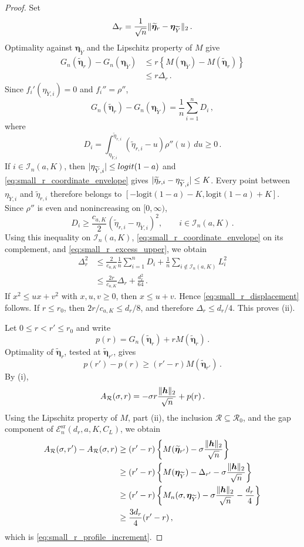 \documentclass[10pt,a4paper]{amsart}
\makeatletter
\def\Ytil{\widetilde{Y}}
\newcommand{\abs}[1]{%
	\ensuremath{%
		\if@display
		\left| #1 \right|
		\else
		\lvert #1 \rvert
		\fi
	}%
}
\def\bEtaYtil{\bb{\eta}_{\Ytil}}
\newcommand*{\bb}{\boldsymbol}
\def\bh{\bb{h}}
\newcommand{\logit}[1]{\ensuremath{\textrm{logit}(#1)}}
\newcommand{\vnorm}[1]{%
	\ensuremath{%
		\if@display
		\left\| #1 \right\|
		\else
		\| #1 \|
		\fi
	}%
}
\makeatother
\begin{document}
\begin{proof}
Set
$$
	\Delta_r
	=
	\frac1{\sqrt n}
	\vnorm{
		\widetilde{\bb\eta}_r-\bEtaYtil
	}_2\,.
$$
Optimality against $\bEtaYtil$ and the Lipschitz property of $M$ give
\begin{equation}
\label{eq:small_r_excess_upper}
\begin{aligned}
	G_n(\widetilde{\bb\eta}_r)
	-
	G_n(\bEtaYtil)
	&\leq
	r
	\left\{
		M(\bEtaYtil)-M(\widetilde{\bb\eta}_r)
	\right\}
	\\
	&\leq
	r\Delta_r\,.
\end{aligned}
\end{equation}
Since $f_i'(\eta_{\Ytil,i})=0$ and $f_i''=\rho''$,
$$
	G_n(\widetilde{\bb\eta}_r)
	-
	G_n(\bEtaYtil)
	=
	\frac1n\sum_{i=1}^nD_i\,,
$$
where
$$
	D_i
	=
	\int_{\eta_{\Ytil,i}}^{\widetilde\eta_{r,i}}
	(\widetilde\eta_{r,i}-u)\rho''(u)\,du
	\geq
	0\,.
$$
If $i\in\mathcal I_n(a,K)$, then
$\abs{\eta_{\Ytil,i}}\leq\logit{1-a}$ and
\eqref{eq:small_r_coordinate_envelope} gives
$\abs{\widetilde\eta_{r,i}-\eta_{\Ytil,i}}\leq K$. Every point between
$\eta_{\Ytil,i}$ and $\widetilde\eta_{r,i}$ therefore belongs to
$[-\logit{1-a}-K,\logit{1-a}+K]$. Since $\rho''$ is even and nonincreasing on
$[0,\infty)$,
$$
	D_i
	\geq
	\frac{c_{a,K}}2
	(\widetilde\eta_{r,i}-\eta_{\Ytil,i})^2,
	\qquad
	i\in\mathcal I_n(a,K)\,.
$$
Using this inequality on $\mathcal I_n(a,K)$,
\eqref{eq:small_r_coordinate_envelope} on its complement, and
\eqref{eq:small_r_excess_upper}, we obtain
$$
\begin{aligned}
	\Delta_r^2
	&\leq
	\frac{2}{c_{a,K}}
	\frac1n\sum_{i=1}^nD_i
	+
	\frac1n
	\sum_{i\notin\mathcal I_n(a,K)}L_i^2
	\\
	&\leq
	\frac{2r}{c_{a,K}}\Delta_r
	+
	\frac{d_r^2}{64}\,.
\end{aligned}
$$
If $x^2\leq ux+v^2$ with $x,u,v\geq0$, then $x\leq u+v$. Hence
\eqref{eq:small_r_displacement} follows. If
$r\leq r_0$, then
$2r/c_{a,K}\leq d_r/8$, and therefore $\Delta_r\leq d_r/4$. This proves
(ii).

Let $0\leq r<r'\leq r_0$ and write
$$
	p(r)
	=
	G_n(\widetilde{\bb\eta}_r)
	+
	rM(\widetilde{\bb\eta}_r)\,.
$$
Optimality of $\widetilde{\bb\eta}_r$, tested at
$\widetilde{\bb\eta}_{r'}$, gives
$$
	p(r')-p(r)
	\geq
	(r'-r)M(\widetilde{\bb\eta}_{r'})\,.
$$
By (i),
$$
	A_{\mathcal R}(\sigma,r)
	=
	-\sigma r\frac{\vnorm{\bh}_2}{\sqrt n}
	+
	p(r)\,.
$$
Using the Lipschitz property of $M$, part (ii), the inclusion
$\mathcal R\subseteq\mathcal R_0$, and the gap component of
$\mathcal E_n^{\mathrm{sr}}(d_r,a,K,C_L)$, we obtain
$$
\begin{aligned}
	A_{\mathcal R}(\sigma,r')
	-
	A_{\mathcal R}(\sigma,r)
	&\geq
	(r'-r)
	\left\{
		M(\widetilde{\bb\eta}_{r'})
		-
		\sigma\frac{\vnorm{\bh}_2}{\sqrt n}
	\right\}
	\\
	&\geq
	(r'-r)
	\left\{
		M(\bEtaYtil)
		-
		\Delta_{r'}
		-
		\sigma\frac{\vnorm{\bh}_2}{\sqrt n}
	\right\}
	\\
	&\geq
	(r'-r)
	\left\{
		M_n(\sigma,\bEtaYtil)
		-
		\sigma\frac{\vnorm{\bh}_2}{\sqrt n}
		-
		\frac{d_r}{4}
	\right\}
	\\
	&\geq
	\frac{3d_r}{4}(r'-r)\,,
\end{aligned}
$$
which is \eqref{eq:small_r_profile_increment}.


\end{proof}
\end{document}
